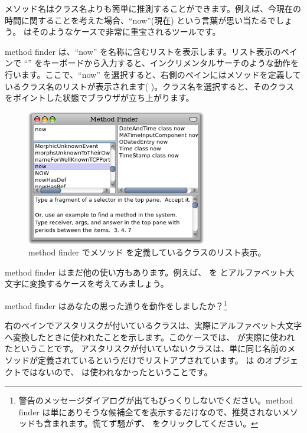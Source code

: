 \documentclass[a4paper,10pt,twoside]{book}
\begin{document}
メソッド名はクラス名よりも簡単に推測することができます。例えば、今現在の時間に関することを考えた場合、``now''(現在) という言葉が思い当たるでしょう。  はそのようなケースで非常に重宝されるツールです。


method finder は、``now'' を名称に含むリストを表示します。リスト表示のペインで ``'' をキーボードから入力すると、インクリメンタルサーチのような動作を行います。ここで、``now'' を選択すると、右側のペインにはメソッドを定義しているクラス名のリストが表示されます( )。クラス名を選択すると、そのクラスをポイントした状態でブラウザが立ち上がります。

\begin{figure}[hbt]
\centerline {\includegraphics[width=0.7\textwidth]{methodFinder-now}}
\caption{method finder でメソッド  を定義しているクラスのリスト表示。
}
\end{figure}

method finder はまだ他の使い方もあります。例えば、 を  とアルファベット大文字に変換するケースを考えてみましょう。

\noindent
method finder はあなたの思った通りを動作をしましたか？\footnote{警告のメッセージダイアログが出てもびっくりしないでください。method finder は単にありそうな候補全てを表示するだけなので、推奨されないメソッドも含まれます。慌てず騒がず、 をクリックしてください。}

右のペインでアスタリスクが付いているクラスは、実際にアルファベット大文字へ変換したときに使われたことを示します。このケースでは、 が実際に使われたということです。
アスタリスクが付いていないクラスは、単に同じ名前のメソッドが定義されているというだけでリストアプされています。 は  のオブジェクトではないので、 は使われなかったということです。
\end{document}
